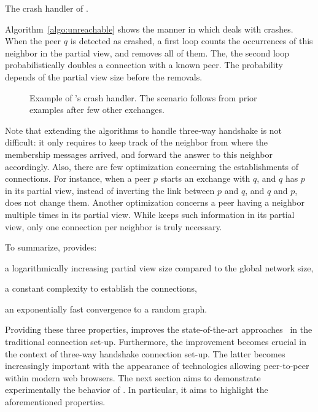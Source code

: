 \begin{algorithm}
  
  \caption{\label{algo:unreachable}The crash handler of \SCAMPLON{}.}
\end{algorithm}

Algorithm~\ref{algo:unreachable} shows the manner in which \SCAMPLON{} deals
with crashes. When the peer $q$ is detected as crashed, a first loop counts the
occurrences of this neighbor in the partial view, and removes all of them. The,
the second loop probabilistically doubles a connection with a known peer. The
probability depends of the partial view size before the removals.

\begin{figure}
  
  \caption{\label{fig:crashexample}Example of \SCAMPLON{}'s crash handler. The
    scenario follows from prior examples after few other exchanges. }
\end{figure}

Note that extending the algorithms to handle three-way handshake is not
difficult: it only requires to keep track of the neighbor from where the
membership messages arrived, and forward the answer to this neighbor
accordingly. Also, there are few optimization concerning the establishments of
connections. For instance, when a peer $p$ starts an exchange with $q$, and $q$
has $p$ in its partial view, instead of inverting the link between $p$ and $q$,
and $q$ and $p$, \SCAMPLON{} does not change them. Another optimization
concerns a peer having a neighbor multiple times in its partial view. While
\SCAMPLON{} keeps such information in its partial view, only one connection per
neighbor is truly necessary.

To summarize, \SCAMPLON{} provides:
\begin{inparaenum}[(i)]
\item a logarithmically increasing partial view size compared to the global
  network size,
\item a constant complexity to establish the connections,
\item an exponentially fast convergence to a random graph.
\end{inparaenum}
Providing these three properties, \SCAMPLON{} improves the state-of-the-art
approaches~\cite{ganesh2001scamp,voulgaris2005cyclon} in the traditional
connection set-up. Furthermore, the improvement becomes crucial in the context
of three-way handshake connection set-up.  The latter becomes increasingly
important with the appearance of technologies allowing peer-to-peer within
modern web browsers.  The next section aims to demonstrate experimentally the
behavior of \SCAMPLON{}. In particular, it aims to highlight the aforementioned
properties.


